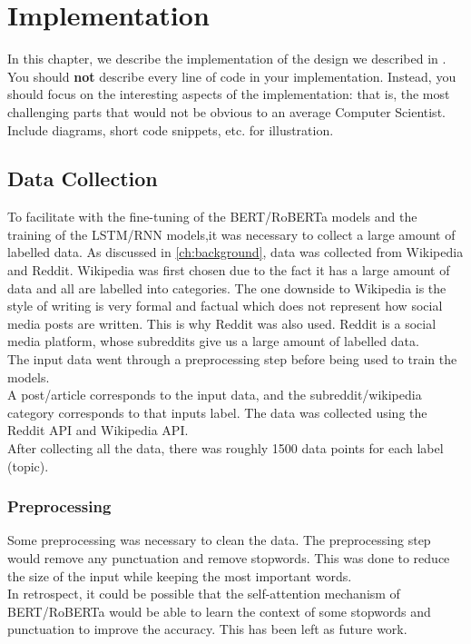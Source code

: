 \chapter{Implementation}
\label{ch:implementation}

In this chapter, we describe the implementation of the design we described in . You should \textbf{not} describe every line of code in your implementation. Instead, you should focus on the interesting aspects of the implementation: that is, the most challenging parts that would not be obvious to an average Computer Scientist. Include diagrams, short code snippets, etc. for illustration. 

\section{Data Collection}
To facilitate with the fine-tuning of the BERT/RoBERTa models and the training of the LSTM/RNN models,it was necessary to collect
a large amount of labelled data. As discussed in \ref{ch:background}, data was collected from Wikipedia and Reddit. Wikipedia was first
chosen due to the fact it has a large amount of data and all are labelled into categories. The one downside to Wikipedia is the style
of writing is very formal and factual which does not represent how social media posts are written. This is why Reddit was also used.
Reddit is a social media platform, whose subreddits give us a large amount of labelled data.\\
The input data went through a preprocessing step before being used to train the models.\\
A post/article corresponds to the input data, and the subreddit/wikipedia category corresponds to that inputs label. The data was collected
using the Reddit API and Wikipedia API.\\
After collecting all the data, there was roughly 1500 data points for each label (topic).
\subsection{Preprocessing}
Some preprocessing was necessary to clean the data. The preprocessing step would remove any punctuation and remove stopwords. This was done
to reduce the size of the input while keeping the most important words.\\
In retrospect, it could be possible that the self-attention mechanism of BERT/RoBERTa would be able to learn the context of some stopwords
and punctuation to improve the accuracy. This has been left as future work.
